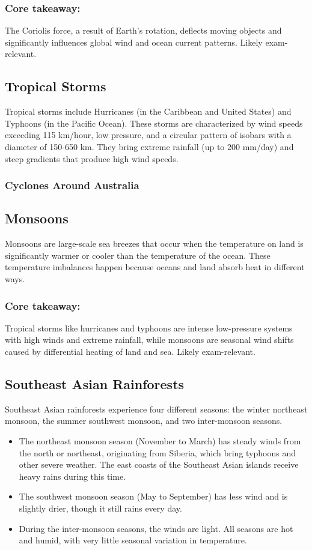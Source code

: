 \subsubsection*{Core takeaway: }
The Coriolis force, a result of Earth's rotation, deflects moving objects and significantly influences global wind and ocean current patterns. Likely exam-relevant.


\subsection{Tropical Storms} 
Tropical storms include Hurricanes (in the Caribbean and United States) and Typhoons (in the Pacific Ocean). These storms are characterized by wind speeds exceeding 115 km/hour, low pressure, and a circular pattern of isobars with a diameter of 150-650 km. They bring extreme rainfall (up to 200 mm/day) and steep gradients that produce high wind speeds. 

\subsubsection{Cyclones Around Australia}
\subsection{Monsoons} 
Monsoons are large-scale sea breezes that occur when the temperature on land is significantly warmer or cooler than the temperature of the ocean. These temperature imbalances happen because oceans and land absorb heat in different ways.

\subsubsection*{Core takeaway:} 
Tropical storms like hurricanes and typhoons are intense low-pressure systems with high winds and extreme rainfall, while monsoons are seasonal wind shifts caused by differential heating of land and sea. Likely exam-relevant.


\subsection{Southeast Asian Rainforests} 
Southeast Asian rainforests experience four different seasons: the winter northeast monsoon, the summer southwest monsoon, and two inter-monsoon seasons. 

\begin{itemize} 
    \item The northeast monsoon season (November to March) has steady winds from the north or northeast, originating from Siberia, which bring typhoons and other severe weather. The east coasts of the Southeast Asian islands receive heavy rains during this time. 
    \item The southwest monsoon season (May to September) has less wind and is slightly drier, though it still rains every day. 
    \item During the inter-monsoon seasons, the winds are light. All seasons are hot and humid, with very little seasonal variation in temperature. 
\end{itemize}

